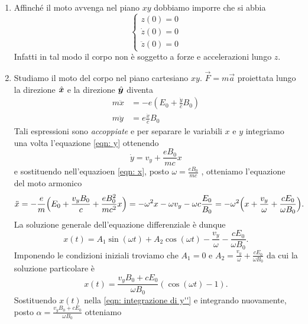 \begin{sol}
	\begin{enumerate}
		\item Affinché il moto avvenga nel piano $ xy $ dobbiamo imporre che si abbia
		\[\begin{cases}
			z(0) = 0 \\
			\dot{z}(0) = 0 \\
			\ddot{z}(0) = 0
		\end{cases}\]
		Infatti in tal modo il corpo non è soggetto a forze e accelerazioni lungo $ z $.
		\item Studiamo il moto del corpo nel piano cartesiano $ xy $. $ \vec F = m \vec a $ proiettata lungo la direzione $ \hat{\boldsymbol{x}} $ e la direzione $ \hat{\boldsymbol{y}} $ diventa
		\begin{align}
		m \ddot{x} & = - e (E_0 + \frac{\dot{y}}{c} B_0) \label{eqn: x} \\
		m \ddot{y} & = e \frac{\dot{x}}{c} B_0 \label{eqn: y}
		\end{align}
		Tali espressioni sono \emph{accoppiate} e per separare le variabili $ x $ e $ y $ integriamo una volta l'equazione \eqref{eqn: y} ottenendo
		\begin{equation} \label{eqn: integrazione di y''}
		\dot{y} = v_y + \frac{e B_0}{mc} x
		\end{equation}
		e sostituendo nell'equazioen \eqref{eqn: x}, posto $ \omega = \frac{e B_0}{mc} $ , otteniamo l'equazione del moto armonico
		\begin{equation}
		\ddot{x} = - \frac{e}{m} \Bigl (E_0 + \frac{v_y B_0}{c} + \frac{e B_0^2}{mc^2} x \Bigr) = - \omega^2 x - \omega v_y - \omega c \frac{E_0}{B_0} = -\omega^2 \Bigl ( x + \frac{v_y}{\omega} + \frac{c E_0}{\omega B_0} \Bigr ).
		\end{equation}
		La soluzione generale dell'equazione differenziale è dunque
		\begin{equation} \label{eqn: sol generale x}
			x(t) = A_1 \sin(\omega t) + A_2 \cos(\omega t) - \frac{v_y}{\omega} - \frac{c E_0}{\omega B_0}.
		\end{equation}
		Imponendo le condizioni iniziali troviamo che $ A_1 = 0 $ e $ A_2 = \frac{v_y}{\omega} + \frac{c E_0}{\omega B_0} $ da cui la soluzione particolare è 
		\begin{equation} \label{eqn: sol particolare x}
		x(t) = \frac{v_y B_0 + c E_0}{\omega B_0}(\cos(\omega t) - 1).
		\end{equation}
		Sostituendo $ x(t) $ nella \eqref{eqn: integrazione di y''} e integrando nuovamente, posto $ \alpha = \frac{v_y B_0 + c E_0}{\omega B_0} $ otteniamo

\end{enumerate}
\end{sol}
